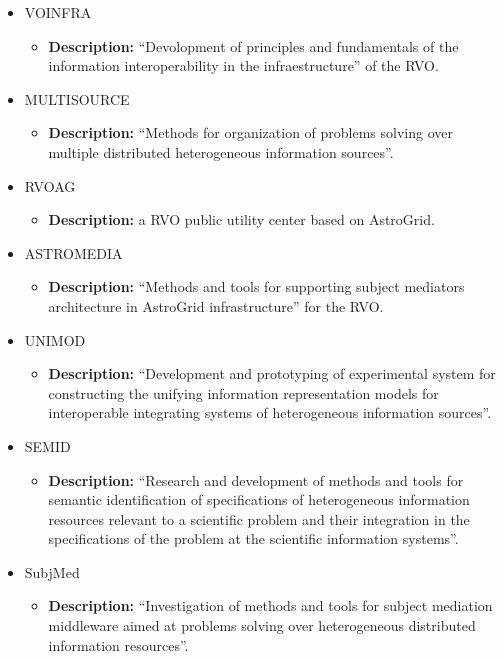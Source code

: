 \begin{itemize}
\begin{itemize}
\item VOINFRA
\begin{itemize}
\item \textbf{Description:} ``Devolopment of principles and fundamentals of the
information interoperability in the infraestructure'' of the RVO.
\end{itemize}
\item MULTISOURCE
\begin{itemize}
\item \textbf{Description:} ``Methods for organization of problems solving over
multiple distributed he\-te\-ro\-ge\-neous information sources''.
\end{itemize}
\item RVOAG
\begin{itemize}
\item \textbf{Description:} a RVO public utility center based on AstroGrid.
\end{itemize}
\item ASTROMEDIA
\begin{itemize}
\item \textbf{Description:} ``Methods and tools for supporting subject mediators
architecture in AstroGrid infrastructure'' for the RVO.
\end{itemize}
\item UNIMOD
\begin{itemize}
\item \textbf{Description:} ``Development and prototyping of experimental system
for constructing the unifying information representation models for
interoperable integrating systems of heterogeneous information sources''.
\end{itemize}
\item SEMID
\begin{itemize}
\item \textbf{Description:} ``Research and development of methods and tools for
semantic identification of specifications of heterogeneous information resources
relevant to a scientific problem and their integration in the specifications of
the problem at the scientific information systems''.
\end{itemize}
\item SubjMed
\begin{itemize}
\item \textbf{Description:} ``Investigation of methods and tools for subject
mediation middleware aimed at problems solving over heterogeneous distributed
information resources''.
\end{itemize}

\end{itemize}
\end{itemize}
